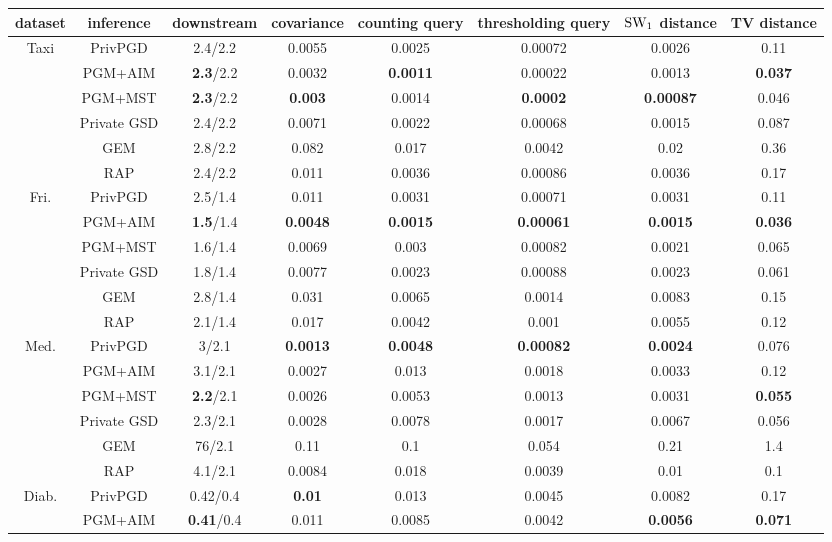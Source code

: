 \begin{table}[ht]
\footnotesize
\centering
\begin{tabular}{cccccccc}
\toprule
dataset & inference & downstream & covariance & counting query & thresholding query & $\text{SW}_1$ distance & TV distance \\
\midrule \multirow{6}{*}{Taxi } & PrivPGD&2.4/2.2 & 0.0055 & 0.0025 & 0.00072 & 0.0026 & 0.11 \\
 & PGM+AIM&\textbf{2.3}/2.2 & 0.0032 & \textbf{0.0011} & 0.00022 & 0.0013 & \textbf{0.037} \\
 & PGM+MST&\textbf{2.3}/2.2 & \textbf{0.003} & 0.0014 & \textbf{0.0002} & \textbf{0.00087} & 0.046 \\
 & Private GSD&2.4/2.2 & 0.0071 & 0.0022 & 0.00068 & 0.0015 & 0.087 \\
 & GEM&2.8/2.2 & 0.082 & 0.017 & 0.0042 & 0.02 & 0.36 \\
 & RAP&2.4/2.2 & 0.011 & 0.0036 & 0.00086 & 0.0036 & 0.17 \\
\midrule \multirow{6}{*}{Fri. } & PrivPGD&2.5/1.4 & 0.011 & 0.0031 & 0.00071 & 0.0031 & 0.11 \\
 & PGM+AIM&\textbf{1.5}/1.4 & \textbf{0.0048} & \textbf{0.0015} & \textbf{0.00061} & \textbf{0.0015} & \textbf{0.036} \\
 & PGM+MST&1.6/1.4 & 0.0069 & 0.003 & 0.00082 & 0.0021 & 0.065 \\
 & Private GSD&1.8/1.4 & 0.0077 & 0.0023 & 0.00088 & 0.0023 & 0.061 \\
 & GEM&2.8/1.4 & 0.031 & 0.0065 & 0.0014 & 0.0083 & 0.15 \\
 & RAP&2.1/1.4 & 0.017 & 0.0042 & 0.001 & 0.0055 & 0.12 \\
\midrule \multirow{6}{*}{Med. } & PrivPGD&3/2.1 & \textbf{0.0013} & \textbf{0.0048} & \textbf{0.00082} & \textbf{0.0024} & 0.076 \\
 & PGM+AIM&3.1/2.1 & 0.0027 & 0.013 & 0.0018 & 0.0033 & 0.12 \\
 & PGM+MST&\textbf{2.2}/2.1 & 0.0026 & 0.0053 & 0.0013 & 0.0031 & \textbf{0.055} \\
 & Private GSD&2.3/2.1 & 0.0028 & 0.0078 & 0.0017 & 0.0067 & 0.056 \\
 & GEM&76/2.1 & 0.11 & 0.1 & 0.054 & 0.21 & 1.4 \\
 & RAP&4.1/2.1 & 0.0084 & 0.018 & 0.0039 & 0.01 & 0.1 \\
\midrule \multirow{6}{*}{Diab. } & PrivPGD&0.42/0.4 & \textbf{0.01} & 0.013 & 0.0045 & 0.0082 & 0.17 \\
 & PGM+AIM&\textbf{0.41}/0.4 & 0.011 & 0.0085 & 0.0042 & \textbf{0.0056} & \textbf{0.071} \\

\end{tabular}
\end{table}
